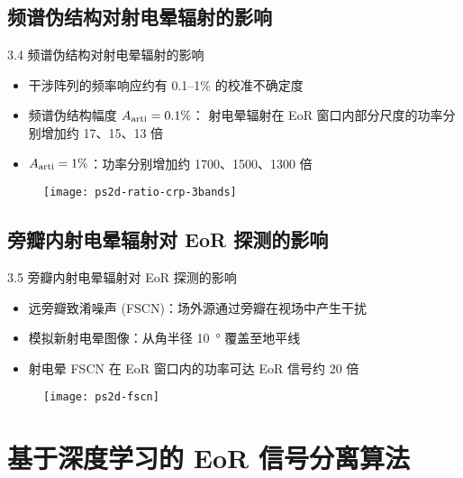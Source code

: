 \documentclass{beamer}
\begin{document}
\subsection{频谱伪结构对射电晕辐射的影响}

\begin{frame}{3.4 频谱伪结构对射电晕辐射的影响}
  \begin{itemize}
    \item 干涉阵列的频率响应约有 0.1--1\% 的校准不确定度
    \item \alert{频谱伪结构}幅度 $A_{\text{arti}} = 0.1\%$：
      射电晕辐射在 EoR 窗口内部分尺度的功率分别增加约 17、15、13 倍
    \item $A_{\text{arti}} = 1\%$：功率分别增加约 1700、1500、1300 倍
  \end{itemize}
  \vspace{-1ex}
  \begin{figure}
    \centering
    \texttt{[image: ps2d-ratio-crp-3bands]}
  \end{figure}
\end{frame}

\subsection{旁瓣内射电晕辐射对 EoR 探测的影响}

\begin{frame}{3.5 旁瓣内射电晕辐射对 EoR 探测的影响}
  \begin{itemize}
    \item \alert{远旁瓣致淆噪声 (FSCN)}：场外源通过旁瓣在视场中产生干扰
    \item 模拟新射电晕图像：从角半径 \SI{10}{\degree} 覆盖至地平线
    \item 射电晕 FSCN 在 EoR 窗口内的功率可达 EoR 信号约 20 倍
  \end{itemize}
  \vspace{-1ex}
  \begin{figure}
    \centering
    \texttt{[image: ps2d-fscn]}
  \end{figure}
\end{frame}


\section{基于深度学习的 EoR 信号分离算法}
\end{document}
